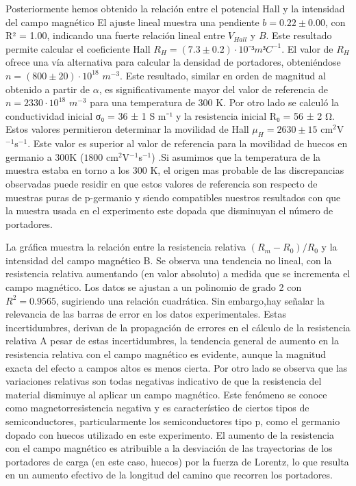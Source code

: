 	\vspace{\baselineskip}
	
	
	Posteriormente hemos obtenido la  relación entre el potencial Hall y la intensidad del campo magnético El ajuste lineal muestra una pendiente $b = 0.22 ± 0.00$, con R² = 1.00, indicando una fuerte relación lineal entre $V_{Hall}$ y $B$. Este resultado permite calcular el coeficiente Hall $R_H = (7.3 \pm 0.2) · 10⁻³ m³C^{-1}$.  El valor de $R_H$ ofrece una vía alternativa para calcular la densidad de portadores, obteniéndose $n=(800\pm20)\cdot 10^{18}$ $m^{-3}$. Este resultado, similar en orden de magnitud al obtenido a partir de $\alpha$, es significativamente mayor del valor de referencia \cite{Madelung2004} de $n=2330 \cdot 10^{18}$ $m^{-3}$ para una temperatura de 300 K. Por otro lado se calculó la conductividad inicial σ₀ = 36 ± 1 S m⁻¹ y la resistencia inicial R₀ = 56 ± 2 Ω. Estos valores permitieron determinar la movilidad de Hall $\mu_H = 2630\pm15$ cm$^2$V$^{-1}$s$^{-1}$. Este valor es superior al valor de referencia para la movilidad de huecos en germanio a 300K ($1800$ cm$^2$V$^{-1}$s$^{-1}$) \cite{Madelung2004}.Si asumimos que la temperatura de la muestra estaba en torno a los 300 K,  el origen mas probable de las discrepancias observadas puede residir en que estos valores de referencia son respecto de muestras puras de p-germanio y siendo compatibles nuestros resultados con que la muestra usada en el experimento este dopada que disminuyan el número de portadores.



	\vspace{\baselineskip}
	
	La gráfica \label{fig:res_rel} muestra la relación entre la resistencia relativa $(R_m - R_0)/R_0$ y la intensidad del campo magnético B. Se observa una tendencia no lineal, con la resistencia relativa aumentando (en valor absoluto) a medida que se incrementa el campo magnético. Los datos se ajustan a un polinomio de grado 2 con $R^2 = 0.9565$, sugiriendo una relación cuadrática. Sin embargo,hay señalar la relevancia de las barras de error en los datos experimentales. Estas incertidumbres, derivan de la propagación de errores en el cálculo de la resistencia relativa A pesar de estas incertidumbres, la tendencia general de aumento en la resistencia relativa con el campo magnético es evidente, aunque la magnitud exacta del efecto a campos altos es menos cierta. Por otro lado se observa que las  variaciones relativas son todas negativas indicativo de que  la resistencia del material disminuye al aplicar un campo magnético. Este fenómeno se conoce como magnetorresistencia negativa y es característico de ciertos tipos de semiconductores, particularmente los semiconductores tipo p, como el germanio dopado con huecos utilizado en este experimento. El aumento de la resistencia con el campo magnético es atribuible a la desviación de las trayectorias de los portadores de carga (en este caso, huecos) por la fuerza de Lorentz, lo que resulta en un aumento efectivo de la longitud del camino que recorren los portadores.


